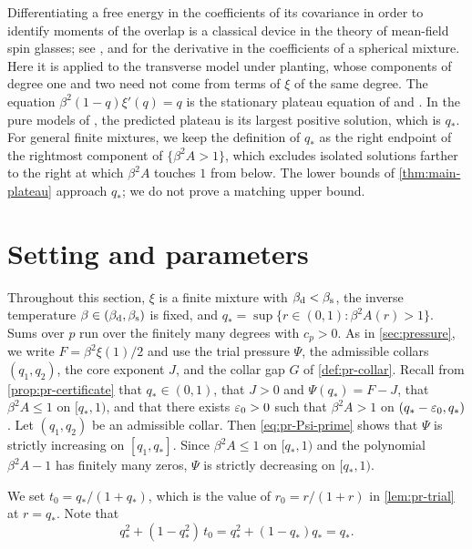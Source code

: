 Differentiating a free energy in the coefficients of its covariance in order to identify moments of the overlap is a classical device in the theory of mean-field spin glasses; see \cite{Panchenko2008}, and \cite[Proposition~2.2]{AuffingerElAlaouiSellke2025} for the derivative in the coefficients of a spherical mixture. Here it is applied to the transverse model under planting, whose components of degree one and two need not come from terms of $\xi$ of the same degree. The equation $\beta^2(1-q)\xi'(q)=q$ is the stationary plateau equation of \cite[Eq.~(14)]{BarratBurioniMezard1996} and \cite[Eq.~(A2)]{FolenaFranzRicciTersenghi2020}. In the pure models of \cite{BarratBurioniMezard1996}, the predicted plateau is its largest positive solution, which is $q_*$. For general finite mixtures, we keep the definition of $q_*$ as the right endpoint of the rightmost component of $\{\beta^2A>1\}$, which excludes isolated solutions farther to the right at which $\beta^2A$ touches $1$ from below. The lower bounds of \cref{thm:main-plateau} approach $q_*$; we do not prove a matching upper bound.


\section{Setting and parameters}\label{sec:pl-setting}

Throughout this section, $\xi$ is a finite mixture with $\beta_{\mathrm d}<\beta_{\mathrm s}$, the inverse temperature $\beta\in(\beta_{\mathrm d},\beta_{\mathrm s})$ is fixed, and $q_*=\sup\{r\in(0,1)\colon\beta^2A(r)>1\}$. Sums over $p$ run over the finitely many degrees with $c_p>0$. As in \cref{sec:pressure}, we write $F=\beta^2\xi(1)/2$ and use the trial pressure $\Psi$, the admissible collars $(q_1,q_2)$, the core exponent $J$, and the collar gap $G$ of \cref{def:pr-collar}. Recall from \cref{prop:pr-certificate} that $q_*\in(0,1)$, that $J>0$ and $\Psi(q_*)=F-J$, that $\beta^2A\le1$ on $[q_*,1)$, and that there exists $\varepsilon_0>0$ such that $\beta^2A>1$ on $(q_*-\varepsilon_0,q_*)$. Let $(q_1,q_2)$ be an admissible collar. Then \eqref{eq:pr-Psi-prime} shows that $\Psi$ is strictly increasing on $[q_1,q_*]$. Since $\beta^2A\le1$ on $[q_*,1)$ and the polynomial $\beta^2A-1$ has finitely many zeros, $\Psi$ is strictly decreasing on $[q_*,1)$.

We set $t_0=q_*/(1+q_*)$, which is the value of $r_0=r/(1+r)$ in \cref{lem:pr-trial} at $r=q_*$. Note that
\begin{equation}\label{eq:pl-t0}
q_*^2+(1-q_*^2)\,t_0=q_*^2+(1-q_*)q_*=q_* .
\end{equation}

